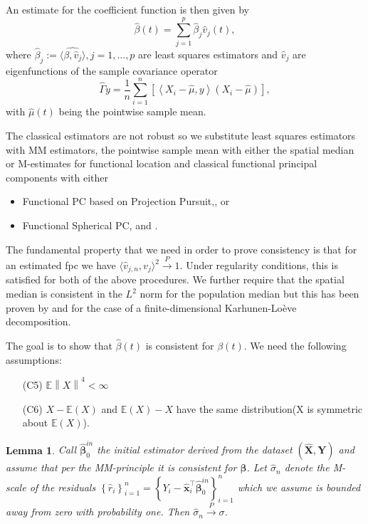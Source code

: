 \documentclass[11pt]{article}
\newtheorem{lem}{Lemma}[section]
\begin{document}
An estimate for the coefficient function is then given by 
\begin{equation*}
\widehat{\beta}(t) = \sum_{j=1}^p \widehat{\beta}_j \widehat{v}_j(t),
\end{equation*}
where $\widehat{\beta}_j := \widehat{\langle \beta, \widehat{v}_j \rangle}, j = 1, \ldots, p $ are least squares estimators and $\widehat{v}_j$ are eigenfunctions of the sample covariance operator
\begin{equation*}
\widehat{\Gamma}y = \frac{1}{n} \sum_{i=1}^n \left[ \left \langle X_i -\widehat{\mu}, y  \right \rangle  \left( X_i -\widehat{\mu} \right)  \right],
\end{equation*}
with $\widehat{\mu}(t)$ being the pointwise sample mean.

The classical estimators are not robust so we substitute least squares estimators with MM estimators, the pointwise sample mean with either the spatial median or M-estimates for functional location and classical functional principal components with either
\begin{itemize}
\item Functional PC based on Projection Pursuit,\citep{bali2011robust}, 
or  
\item Functional Spherical PC, \citep{locantore1999robust} and \citep{gervini2008robust}.
\end{itemize}

The fundamental property that we need in order to prove consistency is that for an estimated fpc we have $\langle \widehat{v}_{j,n}, v_j \rangle^2 \xrightarrow{P} 1$. Under regularity conditions, this is satisfied for both of the above procedures. We further require that the spatial median is consistent in the $L^2$ norm for the population median but this has been proven by \citep{gervini2008robust} and \citep{sinova2018m} for the case of a finite-dimensional Karhunen-Loève decomposition.

The goal is to show that $\widehat{\beta}(t)$ is consistent for $\beta(t)$. We need the following assumptions:

\begin{itemize}
\item[(C5)] $\mathbb{E}\left\|X \right\|^4 < \infty$
\item[(C6)] $X - \mathbb{E}(X) $ and $\mathbb{E}(X)- X$ have the same distribution(X is symmetric about $\mathbb{E}(X)$).
\end{itemize}

\begin{lem}
Call $\widehat{\boldsymbol{\beta}}_0^{in}$ the initial estimator derived from the dataset $\left( \mathbf{\widehat{X}}, \mathbf{Y} \right)$ and assume that per the MM-principle it is consistent for $\boldsymbol{\beta}$. Let $\widehat{\sigma}_n$ denote the M-scale of the residuals $\left\{ \widehat{r}_i \right\}_{i=1}^n = \left\{ Y_i - \widehat{\mathbf{x}}_i^{\top
} \widehat{\boldsymbol{\beta}}_0^{in} \right\}_{i=1}^n$ which we assume is bounded away from zero with probability one. Then $\widehat{\sigma}_n \xrightarrow{P} \sigma$. 
\end{lem}
\end{document}
